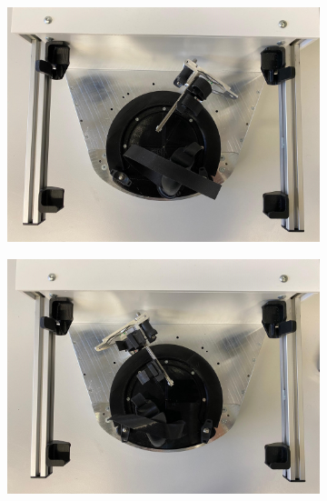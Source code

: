 \documentclass[10pt,oneside,a4paper]{article}
\begin{document}
\begin{figure}[h!]
\centering
\begin{subfigure}[b]{0.48\textwidth}
	\centering
	\includegraphics[width=\textwidth]{images/Hardware/leftside.jpeg}
\end{subfigure}
\hfill
\begin{subfigure}[b]{0.48\textwidth}
	\centering
	\includegraphics[width=\textwidth]{images/Hardware/rightside.jpeg}
\end{subfigure}\\
\vspace*{0.4cm}
\begin{subfigure}[b]{0.48\textwidth}
	\centering

\end{subfigure}
\end{figure}
\end{document}
